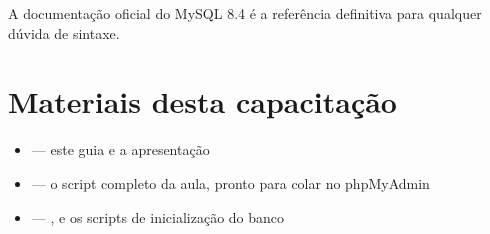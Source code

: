 A documentação oficial do MySQL 8.4 \cite{mysql84} é a referência definitiva
para qualquer dúvida de sintaxe.

\section{Materiais desta capacitação}

\begin{itemize}
    \item {} --- este guia e a apresentação
    \item {} --- o script completo da aula, pronto
          para colar no phpMyAdmin
    \item {} --- ,
           e os scripts de inicialização do banco
\end{itemize}

